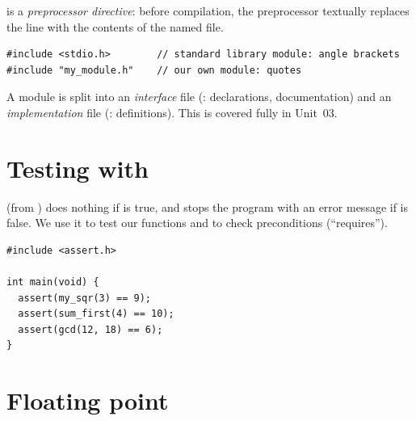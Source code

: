  is a \emph{preprocessor directive}: before compilation, the preprocessor
textually replaces the line with the contents of the named file.
\begin{lstlisting}[style=c]
#include <stdio.h>        // standard library module: angle brackets
#include "my_module.h"    // our own module: quotes
\end{lstlisting}
A module is split into an \emph{interface} file (: declarations, documentation) and
an \emph{implementation} file (: definitions). This is covered fully in Unit~03.

\begin{center}
\end{center}

\section{Testing with }

 (from ) does nothing if  is true, and stops the
program with an error message if  is false. We use it to test our functions and to
check preconditions (``requires'').
\begin{lstlisting}[style=c]
#include <assert.h>

int main(void) {
  assert(my_sqr(3) == 9);
  assert(sum_first(4) == 10);
  assert(gcd(12, 18) == 6);
}
\end{lstlisting}

\section{Floating point}

